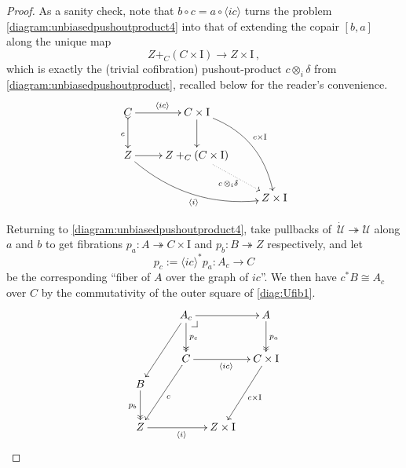\documentclass[11pt]{amsart}
\makeatletter
\newcommand{\mono}{\ensuremath{\rightarrowtail}}
\newcommand{\ra}{\ensuremath{\rightarrow}}
\newcommand{\fib}{\ensuremath{\twoheadrightarrow}}
\newcommand{\too}{\ensuremath{\longrightarrow}}
\newcommand{\gph}[1]{\ensuremath{\langle #1 \rangle}}
\newcommand{\I}{\ensuremath{\mathrm{I}}}
\newcommand{\U}{\ensuremath{\mathcal{U}}}
\newcommand{\UU}{\ensuremath{\,\dot{\mathcal{U}}}}
\theoremstyle{remark}
\theoremstyle{definition}
\newcommand{\pbcorner}[1][dr]{\save*!/#1-1.2pc/#1:(-1,1)@^{|-}\restore}
\makeatother
\begin{document}
\begin{proof}
 As a sanity check, note that $b\circ c = a\circ \langle ic\rangle$ turns the problem \eqref{diagram:unbiasedpushoutproduct4} into that of extending the copair $[b,a]$ along the unique map $$Z +_C (C\times \I)\too Z\times \I\,,$$ which is exactly the
(trivial cofibration) pushout-product $c\otimes_i\delta$ from \eqref{diagram:unbiasedpushoutproduct}, recalled below for the reader's convenience.%
\begin{equation}\label{diagram:unbiasedpushoutproduct5}
\xymatrix{
C \ar@{>->}[d]_{c} \ar[r]^{\gph{ic}} & C\times \I \ar[d] \ar@/^4ex/ [rdd]^{c\times\I}\\
Z \ar@/_4ex/ [rrd]_{\gph{i}} \ar[r] &  Z +_C (C\times\I) \ar@{.>}[rd]_{c\, \otimes_i \delta} \\
&& Z\times\I
}
\end{equation}
%
%

Returning to \eqref{diagram:unbiasedpushoutproduct4}, take pullbacks of $\UU\fib \U$ along $a$ and $b$ to get fibrations $p_a : A\fib C\times \I$ and $p_b : B\fib Z$ respectively, and let 
$$p_c :=  \gph{ic}^*p_a : A_c \too C$$
be the corresponding ``fiber of $A$ over the graph of $ic$''.  We then have $c^*B \cong A_c$ over $C$ by the commutativity of the outer square of \eqref{diag:Ufib1}.
\[
\xymatrix@=1em{
&& \ar[llddd] A_c \ar@{->>}[dd]^{p_c} \ar[rr]  \pbcorner &&  A \ar@{->>}[dd]^{p_a} \\
&& && \\
&& \ar[llddd]^c C \ar[rr]_{\gph{ic}}  &&  \ar[lddd]^{c\times \I} C\times\I \\
B \ar@{->>}[dd]_{p_b} &&&& \\
&&&& \\
Z \ar[rrr]_{\gph{i}} &&& Z\times\I &
}
\]


\end{proof}
\end{document}
